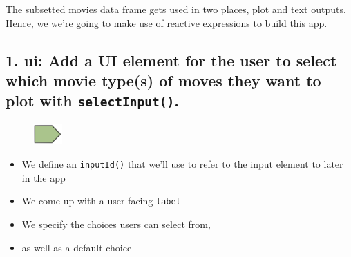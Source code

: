 \documentclass[
  letterpaper,
  DIV=11,
  numbers=noendperiod]{scrreprt}
\newenvironment{Shaded}{\begin{snugshade}}{\end{snugshade}}
\newcommand{\AttributeTok}[1]{\textcolor[rgb]{0.40,0.46,0.14}{#1}}
\newcommand{\CommentTok}[1]{\textcolor[rgb]{0.37,0.37,0.37}{#1}}
\newcommand{\FunctionTok}[1]{\textcolor[rgb]{0.28,0.35,0.67}{#1}}
\newcommand{\NormalTok}[1]{\textcolor[rgb]{0.00,0.46,0.62}{#1}}
\newcommand{\SpecialCharTok}[1]{\textcolor[rgb]{0.37,0.37,0.37}{#1}}
\newcommand{\StringTok}[1]{\textcolor[rgb]{0.13,0.47,0.30}{#1}}
\providecommand{\tightlist}{%
  \setlength{\itemsep}{0pt}\setlength{\parskip}{0pt}}
\begin{document}
The subsetted movies data frame gets used in two places, plot and text
outputs. Hence, we we're going to make use of reactive expressions to
build this app.

\hypertarget{ui-add-a-ui-element-for-the-user-to-select-which-movie-types-of-moves-they-want-to-plot-with-selectinput.}{%
\subsection{\texorpdfstring{1. \textbf{ui:} Add a UI element for the
user to select which movie type(s) of moves they want to plot with
\texttt{selectInput()}.}{1. ui: Add a UI element for the user to select which movie type(s) of moves they want to plot with selectInput().}}\label{ui-add-a-ui-element-for-the-user-to-select-which-movie-types-of-moves-they-want-to-plot-with-selectinput.}}

\begin{figure}

\includegraphics[width=0.1\textwidth,height=\textheight]{./images/input.png} \hfill{}

\end{figure}

\begin{Shaded}
\end{Shaded}

\begin{itemize}
\tightlist
\item
  We define an \texttt{inputId()} that we'll use to refer to the input
  element to later in the app
\item
  We come up with a user facing \texttt{label}
\item
  We specify the choices users can select from,
\item
  as well as a default choice
\end{itemize}
\end{document}
